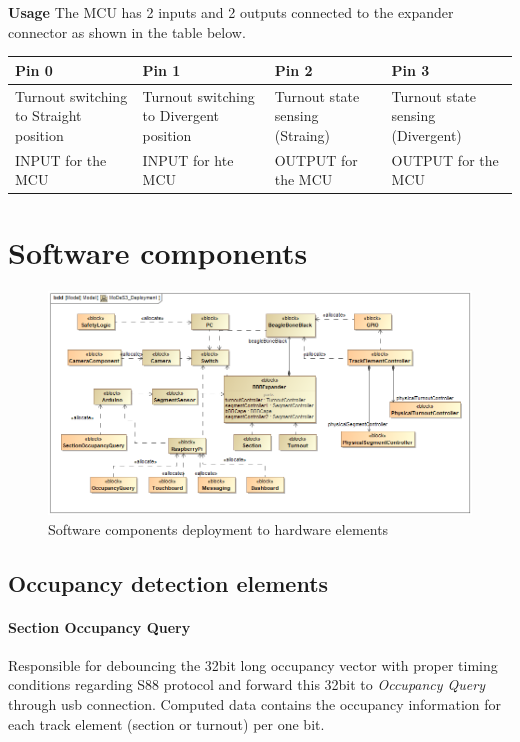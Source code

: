 \textbf{Usage}
The MCU has 2 inputs and 2 outputs connected to the expander connector as shown in the table below.
\begin{center}
	\renewcommand{\arraystretch}{1.5}
	\begin{tabu} to 1.0\textwidth {X[c] X[c] X[c] X[c]}
		\toprule
		Pin 0                                  & Pin 1                                   & Pin 2                           & Pin 3                             \\ \midrule
		Turnout switching to Straight position & Turnout switching to Divergent position & Turnout state sensing (Straing) & Turnout state sensing (Divergent) \\
		INPUT for the MCU                      & INPUT for hte MCU                       & OUTPUT for the MCU              & OUTPUT for the MCU                \\ \bottomrule
	\end{tabu}
\end{center}


\section{Software components}
\begin{figure}[h]
	\centering
	\includegraphics[width=150mm]{figures/modes3/MoDeS3_Deployment1.png}
	\caption{Software components deployment to hardware elements}
	\label{fig:Modes3Deployment}
\end{figure}

\subsection{Occupancy detection elements} \label{section:OccupancyDetection}
\paragraph{Section Occupancy Query}
Responsible for debouncing the 32bit long occupancy vector with proper timing conditions regarding S88 protocol and forward this 32bit to \textit{Occupancy Query} through usb connection. Computed data contains the occupancy information for each track element (section or turnout) per one bit.
